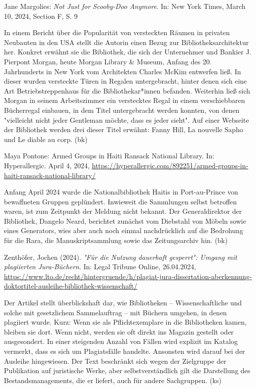 \documentclass[a4paper,
fontsize=11pt,
oneside,
numbers=noperiodatend,
parskip=half-,
bibliography=totoc,
final
]{scrartcl}
\begin{document}
Jane Margolies: \emph{Not Just for Scooby-Doo Anymore}. In: New York
Times, March 10, 2024, Section F, S. 9

In einem Bericht über die Popularität von versteckten Räumen in privaten
Neubauten in den USA stellt die Autorin einen Bezug zur
Bibliotheksarchitektur her. Konkret erwähnt sie die Bibliothek, die sich
der Unternehmer und Bankier J. Pierpont Morgan, heute Morgan Library \&
Museum, Anfang des 20. Jahrhunderts in New York vom Architekten Charles
McKim entwerfen ließ. In dieser wurden versteckte Türen in Regalen
untergebracht, hinter denen sich eine Art Betriebstreppenhaus für die
Bibliothekar*innen befanden. Weiterhin ließ sich Morgan in seinem
Arbeitszimmer ein verstecktes Regal in einem verschiebbaren Bücherregal
einbauen, in dem Titel untergebracht werden konnten, von denen
"vielleicht nicht jeder Gentleman möchte, dass es jeder sieht". Auf
einer Webseite der Bibliothek werden drei dieser Titel erwähnt: Fanny
Hill, La nouvelle Sapho und Le diable au corp. (bk)

Maya Pontone: Armed Groups in Haiti Ransack National Library. In:
Hyperallergic. April 4, 2024,
\url{https://hyperallergic.com/892251/armed-groups-in-haiti-ransack-national-library/}

Anfang April 2024 wurde die Nationalbibliothek Haitis in Port-au-Prince
von bewaffneten Gruppen geplündert. Inwieweit die Sammlungen selbst
betroffen waren, ist zum Zeitpunkt der Meldung nicht bekannt. Der
Generaldirektor der Bibliothek, Dangelo Neard, berichtet zunächst vom
Diebstahl von Möbeln sowie eines Generators, wies aber auch noch einmal
nachdrücklich auf die Bedrohung für die Rara, die Manuskriptsammlung
sowie das Zeitungsarchiv hin. (bk)

Zenthöfer, Jochen (2024). \emph{"Für die Nut­zung dau­er­haft gesperrt":
Umgang mit plagiierten Jura-Büchern}. In: Legal Tribune Online,
26.04.2024,
\url{https://www.lto.de/recht/hintergruende/h/plagiat-jura-dissertation-aberkennung-doktortitel-ausleihe-bibliothek-wissenschaft/}

Der Artikel stellt überblickshaft dar, wie Bibliotheken --
Wissenschaftliche und solche mit gesetzlichem Sammelauftrag -- mit
Büchern umgehen, in denen plagiiert wurde. Kurz: Wenn sie als
Pflichtexemplare in die Bibliotheken kamen, bleiben sie dort. Wenn
nicht, werden sie oft direkt ins Magazin gestellt oder ausgesondert. In
einer steigenden Anzahl von Fällen wird explizit im Katalog vermerkt,
dass es sich um Plagiatsfälle handelte. Ansonsten wird darauf bei der
Ausleihe hingewiesen. Der Text beschränkt sich wegen der Zielgruppe der
Publikation auf juristische Werke, aber selbstverständlich gilt die
Darstellung des Bestandsmanagements, die er liefert, auch für andere
Sachgruppen. (ks)
\end{document}
